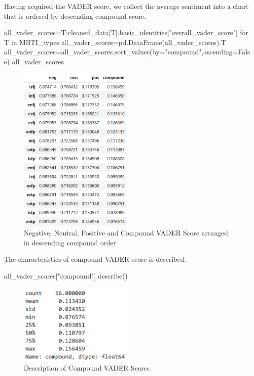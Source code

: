 \documentclass[12pt]{article}
\numberwithin{figure}{section}  %
\begin{document}
	Having acquired the VADER score, we collect the average sentiment into a
	chart that is ordered by descending compound score.
	\begin{python}
all_vader_scores={T:cleaned_data[T].basic_identities["overall_vader_score"] for T in MBTI_types}
all_vader_scores=pd.DataFrame(all_vader_scores).T
all_vader_scores=all_vader_scores.sort_values(by="compound",ascending=False)
all_vader_scores
	\end{python}
	\begin{figure}[H]
			\centering
			\includegraphics[width=0.5\textwidth]{Q2VADERSCORE} 
			\caption{\centering Negative, Neutral, Positive and Compound VADER Score arranged in descending compound order}		
	\end{figure}
	The characteristics of compound VADER score is described.
	\begin{python}
all_vader_scores["compound"].describe()
	\end{python}
	\begin{figure}[H]
			\centering
			\includegraphics[width=0.5\textwidth]{Q2CV} 
			\caption{\centering Description of Compound VADER Scores}		
	\end{figure}
	
\end{document}

